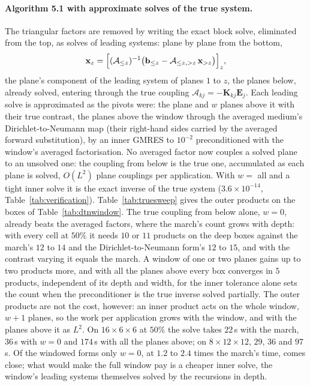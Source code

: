 \documentclass[11pt,a4paper]{article}
\newcommand{\bK}{\mathbf{K}}
\begin{document}
\paragraph{Algorithm 5.1 with approximate solves of the true system.} The triangular factors are removed by writing
the exact block solve, eliminated from the top, as solves of leading systems: plane by plane from the bottom,
\begin{equation}\label{eq:truesweep}
  \mathbf x_z=\Bigl[(\mathcal A_{\le z})^{-1}\bigl(\mathbf b_{\le z}-\mathcal A_{\le z,>z}\,\mathbf x_{>z}\bigr)\Bigr]_z ,
\end{equation}
the plane's component of the leading system of planes $1$ to $z$, the planes below, already solved, entering
through the true coupling $\mathcal A_{kj}=-\bK_{kj}\mathbf E_j$. Each leading solve is approximated as the
pivots were: the plane and $w$ planes above it with their true contrast, the planes above the window through the
averaged medium's Dirichlet-to-Neumann map (their right-hand sides carried by the averaged forward substitution),
by an inner GMRES to $10^{-2}$ preconditioned with the window's averaged factorisation. No averaged factor now
couples a solved plane to an unsolved one: the coupling from below is the true one, accumulated as each plane is
solved, $O(L^2)$ plane couplings per application. With $w=$ all and a tight inner solve it is the exact inverse of
the true system ($3.6\times10^{-14}$, Table~\ref{tab:verification}). Table~\ref{tab:truesweep} gives the outer
products on the boxes of Table~\ref{tab:dtnwindow}. The true coupling from below alone, $w=0$, already
beats the averaged factors, where the march's count grows with depth: with every cell at $50\%$ it needs $10$
or $11$ products on the deep boxes against the march's $12$ to $14$ and the Dirichlet-to-Neumann form's $12$ to
$15$, and with the contrast varying it equals the march. A window of one or two planes gains up to two products more,
and with all the planes above every box converges in $5$ products, independent of its depth and width, for
the inner tolerance alone sets the count when the preconditioner is the true inverse solved partially. The outer
products are not the cost, however: an inner product acts on the whole window, $w+1$ planes, so the work per
application grows with the window, and with the planes above it as $L^2$. On $16\times6\times6$ at $50\%$ the
solve takes $22$\,s with the march, $36$\,s with $w=0$ and $174$\,s with all the planes above; on
$8\times12\times12$, $29$, $36$ and $97$\,s. Of the windowed forms only $w=0$, at $1.2$ to $2.4$ times the
march's time, comes close; what would make the full window pay is a cheaper inner solve, the window's
leading systems themselves solved by the recursions in depth.
\end{document}
